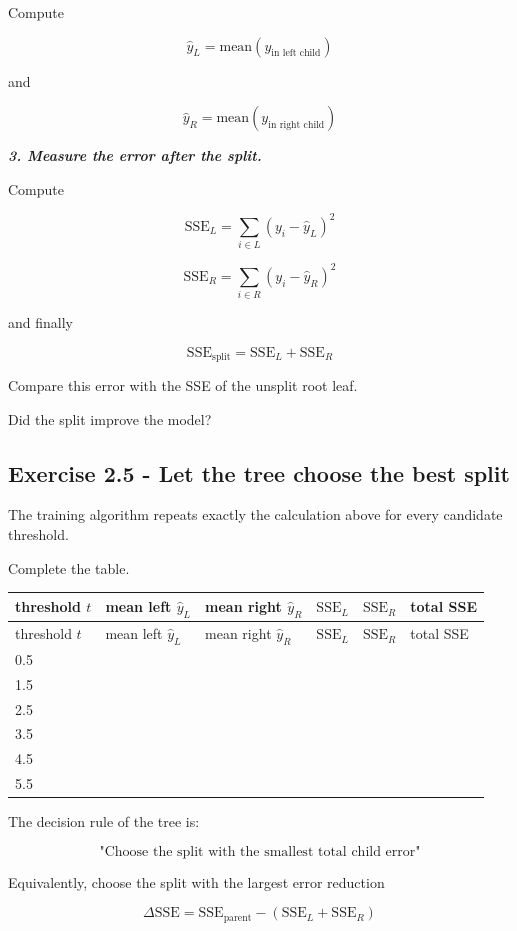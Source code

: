 \documentclass{course_sheet}
\begin{document}
Compute

\[
\hat y_L = \mathrm{mean}(y_\text{in left child})
\]

and

\[
\hat y_R = \mathrm{mean}(y_\text{in right child})
\]

\textbf{\textit{3. Measure the error after the split.}}

Compute

\[
\mathrm{SSE}_L
=
\sum_{i\in L}(y_i-\hat y_L)^2
\]

\[
\mathrm{SSE}_R
=
\sum_{i\in R}(y_i-\hat y_R)^2
\]

and finally

\[
\mathrm{SSE}_{\mathrm{split}}
=
\mathrm{SSE}_L+\mathrm{SSE}_R
\]

Compare this error with the SSE of the unsplit root leaf.

Did the split improve the model?

\subsection*{Exercise 2.5 - Let the tree choose the best split}
The training algorithm repeats exactly the calculation above for every candidate threshold.

Complete the table.

\begingroup
\small
\setlength{\tabcolsep}{4pt}
\begin{longtable}{l|l|l|l|l|l}
threshold $t$ & mean left $\hat y_L$ & mean right $\hat y_R$ & $\mathrm{SSE}_L$ & $\mathrm{SSE}_R$ & total SSE \\
\hline
\endfirsthead
threshold $t$ & mean left $\hat y_L$ & mean right $\hat y_R$ & $\mathrm{SSE}_L$ & $\mathrm{SSE}_R$ & total SSE \\
\hline
\endhead
0.5 &  &  &  &  &  \\[3pt]
1.5 &  &  &  &  &  \\[3pt]
2.5 &  &  &  &  &  \\[3pt]
3.5 &  &  &  &  &  \\[3pt]
4.5 &  &  &  &  &  \\[3pt]
5.5 &  &  &  &  &  \\[3pt]
\end{longtable}
\endgroup
The decision rule of the tree is:

\[
\text{"Choose the split with the smallest total child error"}
\]

Equivalently, choose the split with the largest error reduction

\[
\Delta \mathrm{SSE}
=
\mathrm{SSE}_{\mathrm{parent}}
-
\left(
\mathrm{SSE}_L+\mathrm{SSE}_R
\right)
\]
\end{document}
